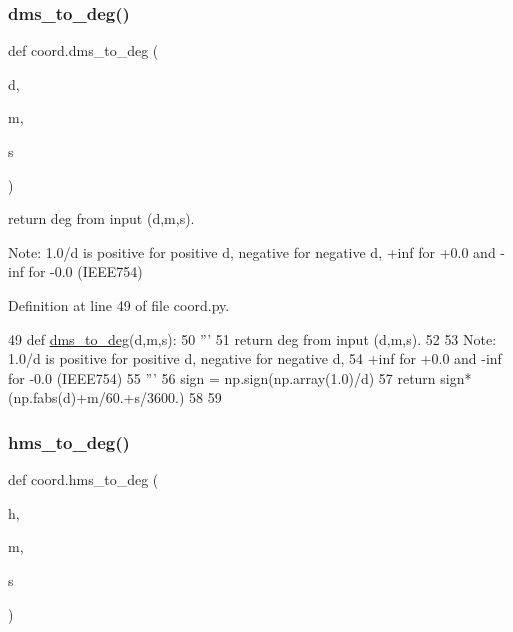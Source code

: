 \subsubsection{\texorpdfstring{dms\+\_\+to\+\_\+deg()}{dms\_to\_deg()}}
{\footnotesize\ttfamily def coord.\+dms\+\_\+to\+\_\+deg (\begin{DoxyParamCaption}\item[{}]{d,  }\item[{}]{m,  }\item[{}]{s }\end{DoxyParamCaption})}

\begin{DoxyVerb}return deg from input (d,m,s).  

Note: 1.0/d is positive for positive d, negative for negative d,
      +inf for +0.0 and -inf for -0.0 (IEEE754)
\end{DoxyVerb}
 

Definition at line 49 of file coord.\+py.


\begin{DoxyCode}
49 \textcolor{keyword}{def }\hyperlink{namespacecoord_af5e3e51606e1533306ebbad1e67d0b17}{dms\_to\_deg}(d,m,s):
50     \textcolor{stringliteral}{'''}
51 \textcolor{stringliteral}{    return deg from input (d,m,s).  }
52 \textcolor{stringliteral}{    }
53 \textcolor{stringliteral}{    Note: 1.0/d is positive for positive d, negative for negative d,}
54 \textcolor{stringliteral}{          +inf for +0.0 and -inf for -0.0 (IEEE754)}
55 \textcolor{stringliteral}{    '''}
56     sign = np.sign(np.array(1.0)/d)
57     \textcolor{keywordflow}{return} sign*(np.fabs(d)+m/60.+s/3600.)
58 
59 
\end{DoxyCode}
\mbox{\label{namespacecoord_ac3ec31a56901971ab03a578d64030901}} 
\subsubsection{\texorpdfstring{hms\+\_\+to\+\_\+deg()}{hms\_to\_deg()}}
{\footnotesize\ttfamily def coord.\+hms\+\_\+to\+\_\+deg (\begin{DoxyParamCaption}\item[{}]{h,  }\item[{}]{m,  }\item[{}]{s }\end{DoxyParamCaption})}



